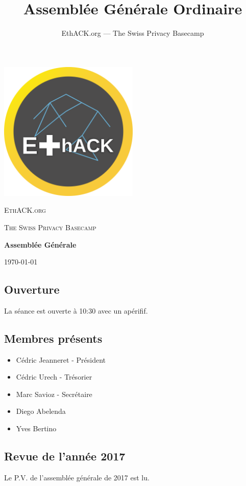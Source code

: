 \documentclass[12pt,twoside]{report}
\author{EthACK.org — The Swiss Privacy Basecamp}
\title{Assemblée Générale Ordinaire}
\begin{document}
\begin{titlepage}
\centering
\includegraphics[width=0.50\textwidth]{../logo-4096.png}\par\vspace{2cm}
{\scshape\LARGE EthACK.org \par}
\vspace{1cm}
{\scshape\Large The Swiss Privacy Basecamp \par}
\vspace{1.5cm}
{\huge\bfseries Assemblée Générale\par}

\vfill
{\large \today\par}
\end{titlepage}
\setlength{\parindent}{0cm}

\subsection*{Ouverture}
La séance est ouverte à 10:30 avec un apérifif.


\subsection*{Membres présents}
\begin{itemize}
\item Cédric Jeanneret - Président
\item Cédric Urech - Trésorier
\item Marc Savioz - Secrétaire
\item Diego Abelenda
\item Yves Bertino
\end{itemize}

\subsection*{Revue de l'année 2017}
Le P.V. de l'assemblée générale de 2017 est lu.
\end{document}

